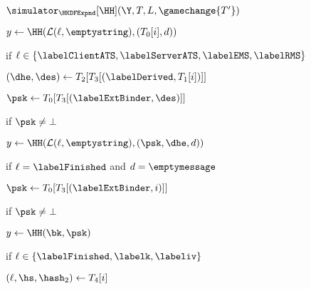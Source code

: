 \begin{figure}[tp]
\begin{minipage}[t]{0.49\textwidth}
\begin{oracle}{$\simulator_{\HKDFExpnd}[\HH](\Y, T, L, \gamechange{T'})$}
		\item \quad $y \gets \HH(\mathcal{L}(\ell,\emptystring),(T_{0}[i], d))$
		\item {}
		\item \quad {}
		\item \quad {}
	\item
	\item if $\ell \in \{ \labelClientATS, \labelServerATS,\labelEMS, \labelRMS \}$
	\item \quad $(\dhe, \des) \gets T_2[T_3[(\labelDerived, T_1[i])]]$
	\item \quad {}
	\item \quad $\psk \gets T_0[T_3[(\labelExtBinder, \des)]]$
	\item \quad {}
	\item \quad if $\psk\neq \bot$
	\item \quad \quad $y \gets \HH(\mathcal{L} (\ell,\emptystring),(\psk, \dhe, d))$ 
	\item \quad {}
	\item \quad \quad {}
	\item \quad \quad {}
	\item
	\item if $\ell = \labelFinished$ and $d = \emptymessage$ 
	\item \quad $\psk \gets T_0[T_3[(\labelExtBinder, i)]]$
	\item \quad {}
	\item \quad if $\psk \neq \bot$ 
	\item \quad \quad $y \gets \HH(\bk, \psk)$
	\item \quad {}
	\item \quad \quad {}
	\item \quad \quad {}
	\item 
	\item if $\ell \in \{\labelFinished, \labelk, \labeliv \}$
	\item \quad $(\ell, \hs, \hash_2) \gets T_4[i]$

\end{oracle}
\end{minipage}
\end{figure}
